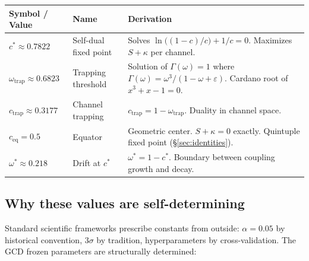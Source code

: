 \documentclass[
  aps,
  prd,
  twocolumn,
  superscriptaddress,
  nofootinbib,
  floatfix
]{revtex4-2}
\newcommand{\Gam}{\Gamma}
\newcommand{\eps}{\varepsilon}
\begin{document}
{\small\setlength{\tabcolsep}{3pt}
\begin{center}
\begin{tabular}{@{}llP{3.0cm}@{}}
\toprule
Symbol / Value & Name & Derivation \\
\midrule
$c^* \approx 0.7822$ & Self-dual fixed point &
  Solves $\ln\!\bigl((1{-}c)/c\bigr) + 1/c = 0$.
  Maximizes $S + \kappa$ per channel. \\[0.5em]
$\omega_{\mathrm{trap}} \approx 0.6823$ & Trapping threshold &
  Solution of $\Gam(\omega) = 1$ where
  $\Gam(\omega) = \omega^3/(1{-}\omega{+}\eps)$.
  Cardano root of $x^3 {+} x {-} 1 = 0$. \\[0.5em]
$c_{\mathrm{trap}} \approx 0.3177$ & Channel trapping &
  $c_{\mathrm{trap}} = 1 - \omega_{\mathrm{trap}}$.
  Duality in channel space. \\[0.5em]
$c_{\mathrm{eq}} = 0.5$ & Equator &
  Geometric center.  $S + \kappa = 0$ exactly.  Quintuple
  fixed point (\S\ref{sec:identities}). \\[0.5em]
$\omega^* \approx 0.218$ & Drift at $c^*$ &
  $\omega^* = 1 - c^*$.  Boundary between coupling growth
  and decay. \\
\bottomrule
\end{tabular}
\end{center}}

\subsection{Why these values are self-determining}

Standard scientific frameworks prescribe constants from outside:
$\alpha = 0.05$ by historical convention, $3\sigma$ by tradition,
hyperparameters by cross-validation.  The GCD frozen parameters are
structurally determined:
\end{document}
